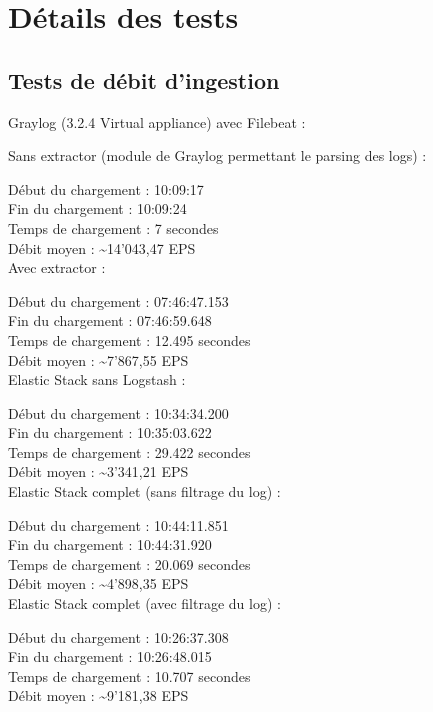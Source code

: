 \documentclass[paper=a4, fontsize=11pt]{scrartcl}
\begin{document}
\section{Détails des tests}

\subsection{Tests de débit d'ingestion}

Graylog (3.2.4 Virtual appliance) avec Filebeat :

Sans extractor (module de Graylog permettant le parsing des logs) :

Début du chargement : 10:09:17 \\
Fin du chargement : 10:09:24 \\
Temps de chargement : 7 secondes \\
Débit moyen : \textasciitilde 14'043,47 EPS \\

Avec extractor :

Début du chargement : 07:46:47.153 \\
Fin du chargement : 07:46:59.648 \\
Temps de chargement : 12.495 secondes \\
Débit moyen : \textasciitilde 7'867,55 EPS \\

Elastic Stack sans Logstash :

Début du chargement : 10:34:34.200 \\
Fin du chargement : 10:35:03.622 \\
Temps de chargement : 29.422 secondes \\
Débit moyen : \textasciitilde 3'341,21 EPS \\

Elastic Stack complet (sans filtrage du log) :

Début du chargement : 10:44:11.851 \\
Fin du chargement : 10:44:31.920 \\
Temps de chargement : 20.069 secondes \\
Débit moyen : \textasciitilde 4'898,35 EPS \\

Elastic Stack complet (avec filtrage du log) :

Début du chargement : 10:26:37.308 \\
Fin du chargement : 10:26:48.015 \\
Temps de chargement : 10.707 secondes \\
Débit moyen : \textasciitilde 9'181,38 EPS \\
\end{document}
